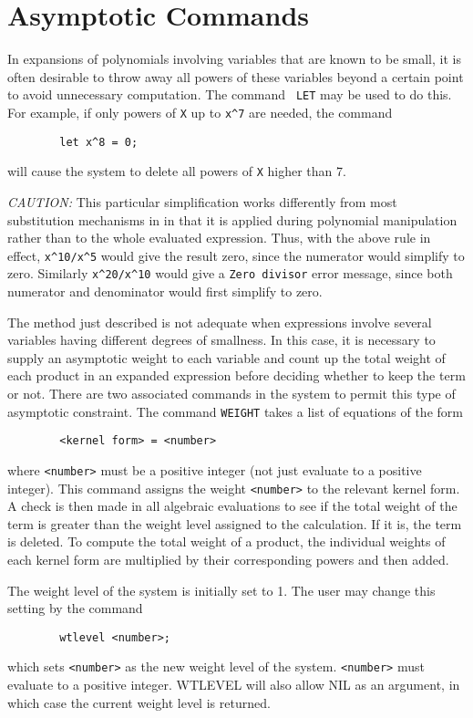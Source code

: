 \section{Asymptotic Commands} 
\label{sec-asymp}
In expansions of polynomials involving variables that are known to be
small, it is often desirable to throw away all powers of these variables
beyond a certain point to avoid unnecessary computation.  The command {\tt
LET} may be used to do this.  For example, if only powers of {\tt X} up to
{\tt x\verb|^|7} are needed, the command
\begin{verbatim}
        let x^8 = 0;
\end{verbatim}
will cause the system to delete all powers of {\tt X} higher than 7.

{\it CAUTION:}  This particular simplification works differently from most
substitution mechanisms in {\REDUCE} in that it is applied during
polynomial manipulation rather than to the whole evaluated expression.
Thus, with the above rule in effect, {\tt x\verb|^|10/x\verb|^|5} would give the
result zero, since the numerator would simplify to zero.  Similarly
{\tt x\verb|^|20/x\verb|^|10} would give a {\tt Zero divisor} error message,
since both numerator and denominator would first simplify to zero.

The method just described is not adequate when expressions involve several
variables having different degrees of smallness. In this case, it is
necessary to supply an asymptotic weight to each variable and count up the
total weight of each product in an expanded expression before deciding
whether to keep the term or not. There are two associated commands in the
system to permit this type of asymptotic constraint. The command {\tt WEIGHT}
takes a list of equations of the form
\begin{verbatim}
        <kernel form> = <number>
\end{verbatim}
where {\tt <number>} must be a positive integer (not just evaluate to a
positive integer).  This command assigns the weight {\tt <number>} to the
relevant kernel form.  A check is then made in all algebraic evaluations
to see if the total weight of the term is greater than the weight level
assigned to the calculation.  If it is, the term is deleted.  To compute
the total weight of a product, the individual weights of each kernel form
are multiplied by their corresponding powers and then added.

The weight level of the system is initially set to 1. The user may change
this setting by the command
\begin{verbatim}
        wtlevel <number>;
\end{verbatim}
which sets {\tt <number>} as the new weight level of the system.
{\tt <number>} must evaluate to a positive integer.  WTLEVEL will also
allow NIL as an argument, in which case the current weight level is returned.
